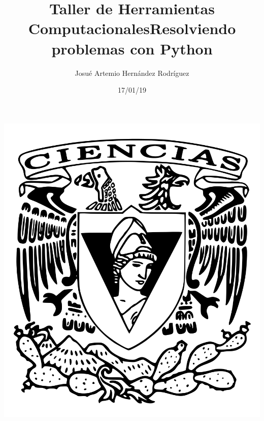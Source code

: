 \documentclass[letterpaper, 12pt, oneside]{article}%
\title{\Huge Taller de Herramientas Computacionales}
\author{Josué Artemio Hernández Rodríguez}%
\date{17/01/19}%
\begin{document}
	\maketitle
	\begin{center}%
		\includegraphics[scale=0.2]{2.png}%
	\end{center}%
	\newpage%
	
	\title{\Huge Resolviendo problemas con Python\\}%
	
\end{document}

